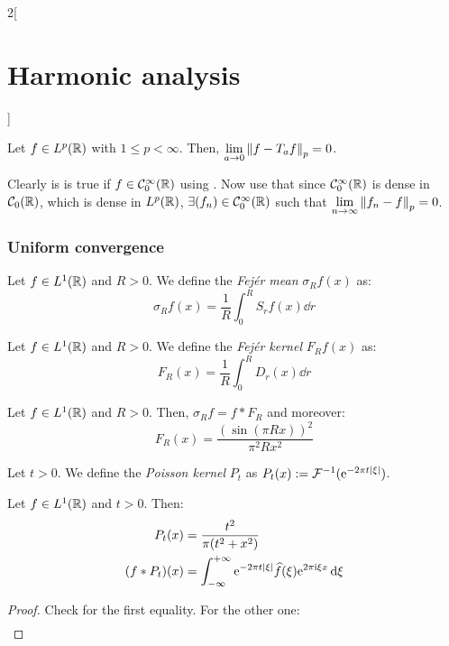 \documentclass[../../../main_math.tex]{subfiles}
\begin{document}
\begin{multicols}{2}[\section{Harmonic analysis}]
\begin{sproof}
  \end{sproof}
  \begin{lemma}\label{HA:translated}
    Let $f\in L^p(\mathbb{R})$ with $1\leq p<\infty$. Then, $\displaystyle \lim_{a\to 0}\left\|f-T_af\right\|_p=0$.
  \end{lemma}
  \begin{sproof}
    Clearly is is true if $f\in\mathcal{C}_0^\infty(\mathbb{R})$ using . Now use that since $\mathcal{C}_0^\infty(\mathbb{R})$ is dense in $\mathcal{C}_0(\mathbb{R})$, which is dense in $L^p(\mathbb{R})$, $\exists(f_n)\in \mathcal{C}_0^\infty(\mathbb{R})$ such that $\displaystyle\lim_{n\to\infty}\left\|f_n-f\right\|_p=0$.
  \end{sproof}
  \subsubsection{Uniform convergence}
  \begin{definition}
    Let $f\in L^1(\mathbb{R})$ and $R>0$. We define the \emph{Fejér mean} $\sigma_Rf(x)$ as: $$\sigma_Rf(x)=\frac{1}{R}\int_{0}^RS_rf(x)\dd{r}$$
  \end{definition}
  \begin{definition}
    Let $f\in L^1(\mathbb{R})$ and $R>0$. We define the \emph{Fejér kernel} $F_Rf(x)$ as: $$F_R(x)=\frac{1}{R}\int_{0}^RD_r(x)\dd{r}$$
  \end{definition}
  \begin{lemma}
    Let $f\in L^1(\mathbb{R})$ and $R>0$. Then, $\sigma_Rf=f*F_R$ and moreover:
    $$F_R(x)=\frac{{\left(\sin\left(\pi R x\right)\right)}^2}{\pi^2 R x^2}$$
  \end{lemma}
  \begin{definition}
    Let $t>0$. We define the \emph{Poisson kernel} $P_t$ as $P_t(x):=\mathcal{F}^{-1}(\mathrm{e}^{-2\pi t\abs{\xi}})$.
  \end{definition}
  \begin{lemma}
    Let $f\in L^1(\mathbb{R})$ and $t>0$. Then:
    \begin{align*}
      P_t(x)     & =\frac{t^2}{\pi(t^2+x^2)}                                                                 \\
      (f*P_t)(x) & =\int_{-\infty}^{+\infty}\mathrm{e}^{-2\pi t\abs{\xi}}\widehat{f}(\xi)\mathrm{e}^{2\pi\mathrm{i}\xi x}\dd{\xi}
    \end{align*}
  \end{lemma}
  \begin{proof}
    Check  for the first equality. For the other one:
    \begin{align*}

\end{align*}
\end{proof}
\end{multicols}
\end{document}
